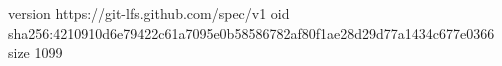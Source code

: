 version https://git-lfs.github.com/spec/v1
oid sha256:4210910d6e79422c61a7095e0b58586782af80f1ae28d29d77a1434c677e0366
size 1099
